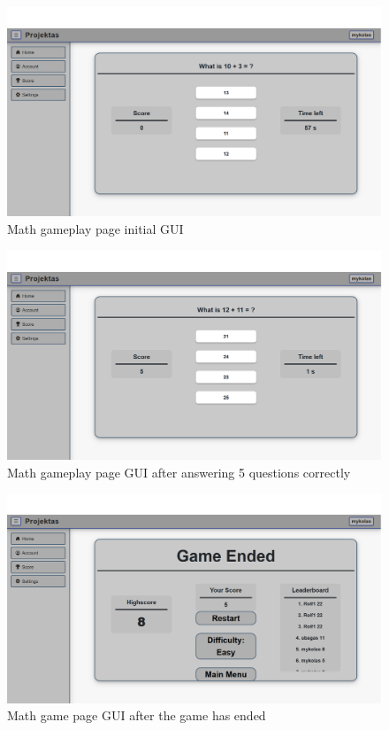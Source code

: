 \documentclass[11pt,a4paper]{article}
\begin{document}
\begin{figure}[H]
    \centering
    \includegraphics[width=1\textwidth,keepaspectratio]{PSI_3rd_trial/PNGs/math_game_1.png}
    \caption{Math gameplay page initial GUI}
    \label{fig:math_game_1}
\end{figure}


\begin{figure}[H]
    \centering
    \includegraphics[width=1\textwidth,keepaspectratio]{PSI_3rd_trial/PNGs/math_game_2.png}
    \caption{Math gameplay page GUI after answering 5 questions correctly}
    \label{fig:math_game_2}
\end{figure}

\begin{figure}[H]
    \centering
    \includegraphics[width=1\textwidth,keepaspectratio]{PSI_3rd_trial/PNGs/math_game_3.png}
    \caption{Math game page GUI after the game has ended}
    \label{fig:math_game_3}
\end{figure}
\end{document}
